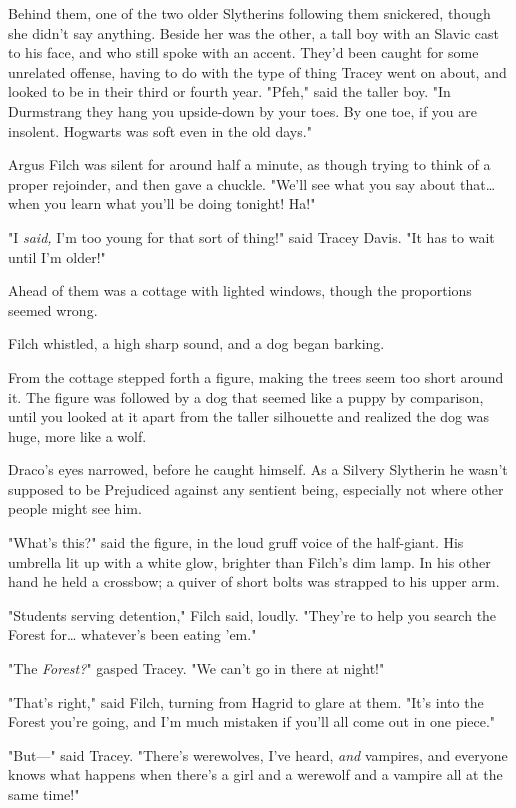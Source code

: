 Behind them, one of the two older Slytherins following them snickered, though 
she didn't say anything. Beside her was the other, a tall boy with an Slavic 
cast to his face, and who still spoke with an accent. They'd been caught for 
some unrelated offense, having to do with the type of thing Tracey went on 
about, and looked to be in their third or fourth year. "Pfeh," said the taller 
boy. "In Durmstrang they hang you upside-down by your toes. By one toe, if you 
are insolent. Hogwarts was soft even in the old days."

Argus Filch was silent for around half a minute, as though trying to think of a 
proper rejoinder, and then gave a chuckle. "We'll see what you say about 
that{\ldots} when you learn what you'll be doing tonight! Ha!"

"I \emph{said,} I'm too young for that sort of thing!" said Tracey Davis. "It 
has to wait until I'm older!"

Ahead of them was a cottage with lighted windows, though the proportions seemed 
wrong.

Filch whistled, a high sharp sound, and a dog began barking.

From the cottage stepped forth a figure, making the trees seem too short around 
it. The figure was followed by a dog that seemed like a puppy by comparison, 
until you looked at it apart from the taller silhouette and realized the dog 
was huge, more like a wolf.

Draco's eyes narrowed, before he caught himself. As a Silvery Slytherin he 
wasn't supposed to be Prejudiced against any sentient being, especially not 
where other people might see him.

"What's this?" said the figure, in the loud gruff voice of the half-giant. His 
umbrella lit up with a white glow, brighter than Filch's dim lamp. In his other 
hand he held a crossbow; a quiver of short bolts was strapped to his upper arm.

"Students serving detention," Filch said, loudly. "They're to help you search 
the Forest for… whatever's been eating 'em."

"The \emph{Forest?}" gasped Tracey. "We can't go in there at night!"

"That's right," said Filch, turning from Hagrid to glare at them. "It's into 
the Forest you're going, and I'm much mistaken if you'll all come out in one 
piece."

"But---" said Tracey. "There's werewolves, I've heard, \emph{and} vampires, and 
everyone knows what happens when there's a girl and a werewolf and a vampire 
all at the same time!"

